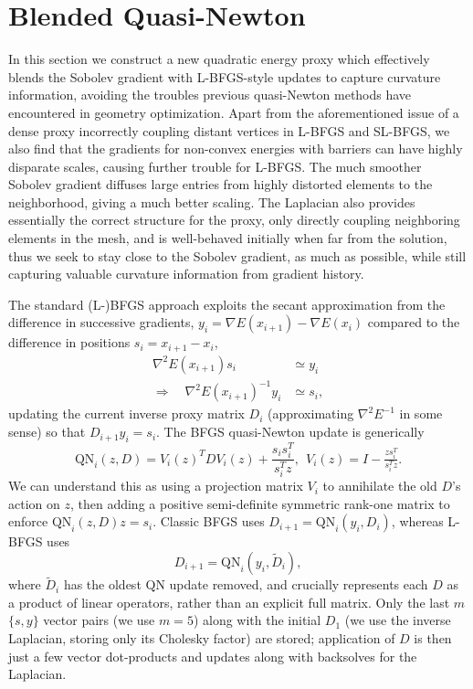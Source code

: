 \section{Blended Quasi-Newton}
\label{sec:blend}

In this section we construct a new quadratic energy proxy which
effectively blends the Sobolev gradient with L-BFGS-style updates
to capture curvature information, avoiding the troubles previous
quasi-Newton methods have encountered in geometry optimization.
Apart from the aforementioned issue of a dense proxy incorrectly
coupling distant vertices in L-BFGS and SL-BFGS, we also find that
the gradients for non-convex energies with barriers can have highly disparate
scales, causing further trouble for L-BFGS. The much smoother
Sobolev gradient diffuses large entries from highly distorted
elements to the neighborhood, giving a much better scaling.
The Laplacian also provides essentially the correct structure for
the proxy, only directly coupling neighboring elements in the mesh,
and is well-behaved initially when far from the solution, thus we
seek to stay close to the Sobolev gradient, as much as possible, while
still capturing valuable curvature information from gradient history.

The standard (L-)BFGS approach exploits the secant approximation
from the difference in successive gradients, 
$y_i = \nabla E(x_{i+1}) - \nabla E(x_{i})$ compared to the
difference in positions $s_i = x_{i+1}-x_i$,
\begin{equation}
\label{eq:proxy_1}
\begin{aligned}
 \nabla^2 E(x_{i+1}) s_i & \simeq  y_i \\
\Rightarrow \quad \nabla^2 E(x_{i+1})^{-1} y_i & \simeq s_i,
\end{aligned}
\end{equation}
updating the current inverse proxy matrix $D_i$ (approximating
$\nabla^2 E^{-1}$ in some sense) so that $D_{i+1}y_i = s_i$.
The BFGS quasi-Newton update is generically
\begin{equation}
\label{eq:BFGS_update}
\mathrm{QN}_i(z, D) = V_i(z)^T D V_i(z) + \frac{s_i s_i^T}{s_i^Tz},  \> \> V_i(z) = I - \tfrac{z s_i^T}{s_i^Tz}.
\end{equation}
We can understand this as using a projection matrix $V_i$ to annihilate
the old $D$'s action on $z$, then adding a positive semi-definite
symmetric rank-one matrix to
enforce $\mathrm{QN}_i(z,D)z = s_i$. Classic BFGS uses
$D_{i+1} = \mathrm{QN}_i(y_i, D_i)$, whereas L-BFGS uses
\begin{equation}
    D_{i+1} = \mathrm{QN}_i(y_i, \tilde{D}_i),
\end{equation}
where $\tilde{D}_i$ has the oldest $\mathrm{QN}$ update removed,
and crucially represents each $D$ as a product of linear operators,
rather than an explicit full matrix. Only the last $m$ $\{s,y\}$ vector pairs (we
use $m=5$) along with the initial $D_1$ (we use the inverse Laplacian,
storing only its Cholesky factor) are stored; application of $D$ is
then just a few vector dot-products and updates along with backsolves for
the Laplacian.

